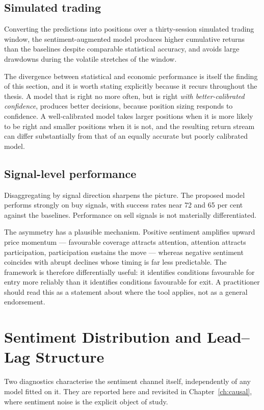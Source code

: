 \subsection{Simulated trading}

Converting the predictions into positions over a thirty-session simulated trading window, the
sentiment-augmented model produces higher cumulative returns than the baselines despite
comparable statistical accuracy, and avoids large drawdowns during the volatile stretches of the
window.

The divergence between statistical and economic performance is itself the finding of this section,
and it is worth stating explicitly because it recurs throughout the thesis. A model that is right
no more often, but is right \emph{with better-calibrated confidence}, produces better decisions,
because position sizing responds to confidence. A well-calibrated model takes larger positions
when it is more likely to be right and smaller positions when it is not, and the resulting return
stream can differ substantially from that of an equally accurate but poorly calibrated model.

\subsection{Signal-level performance}

Disaggregating by signal direction sharpens the picture. The proposed model performs strongly on
buy signals, with success rates near 72 and 65 per cent against the baselines. Performance on sell
signals is not materially differentiated.

The asymmetry has a plausible mechanism. Positive sentiment amplifies upward price momentum ---
favourable coverage attracts attention, attention attracts participation, participation sustains
the move --- whereas negative sentiment coincides with abrupt declines whose timing is far less
predictable. The framework is therefore differentially useful: it identifies conditions favourable
for entry more reliably than it identifies conditions favourable for exit. A practitioner should
read this as a statement about where the tool applies, not as a general endorsement.

\section{Sentiment Distribution and Lead--Lag Structure}
\label{sec:llm-distribution}

Two diagnostics characterise the sentiment channel itself, independently of any model fitted on
it. They are reported here and revisited in Chapter~\ref{ch:causal}, where sentiment noise is the
explicit object of study.

